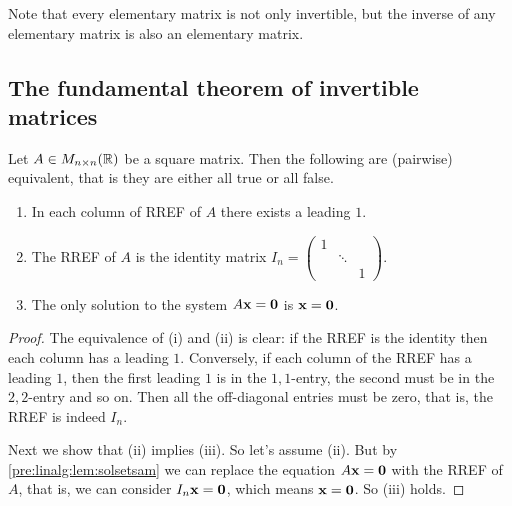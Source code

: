 \documentclass[10pt, a4paper]{article}
\begin{document}
\begin{remark}
    Note that every elementary matrix is not only invertible,
    but the inverse of any elementary matrix is also an elementary matrix.
\end{remark}

\subsection{The fundamental theorem of invertible matrices}
\begin{lemma}\label{linalg:lem:sqmatrrefcond}
    Let $A \in M_{n \times n}(\mathbb{R})$ be a square matrix.
    Then the following are (pairwise) equivalent,
    that is they are either all true or all false.
    \begin{enumerate}[label = (\roman*)]
        \item In each column of RREF of $A$ there exists a leading $1$.
        \item The RREF of $A$ is the identity matrix $I_n = \begin{pmatrix}
            1 & \phantom{} & \phantom{} \\
            \phantom{} & \ddots & \phantom{} \\
            \phantom{} & \phantom{} & 1
        \end{pmatrix}$.
        \item The only solution to the system $A\mathbf{x} = \mathbf{0}$ is $\mathbf{x} = \mathbf{0}$.
    \end{enumerate}
    \begin{proof}
        The equivalence of (i) and (ii) is clear:
        if the RREF is the identity then each column has a leading $1$.
        Conversely, if each column of the RREF has a leading $1$,
        then the first leading $1$ is in the $1, 1$-entry,
        the second must be in the $2, 2$-entry and so on.
        Then all the off-diagonal entries must be zero,
        that is, the RREF is indeed $I_n$.

        Next we show that (ii) implies (iii).
        So let's assume (ii).
        But by \autoref{pre:linalg:lem:solsetsam} we can replace the equation $A\mathbf{x} = \mathbf{0}$ with the RREF of $A$,
        that is, we can consider $I_n\mathbf{x} = \mathbf{0}$,
        which means $\mathbf{x} = \mathbf{0}$.
        So (iii) holds.


\end{proof}
\end{lemma}
\end{document}
